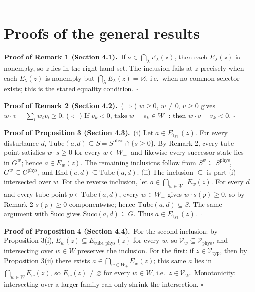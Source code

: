 \documentclass[review,11pt]{elsarticle}
\begin{document}
\begin{center}\rule{0.5\linewidth}{0.5pt}\end{center}


\appendix

\section{Proofs of the general results}

\textbf{Proof of Remark 1 (Section 4.1).}\ If \(a \in \bigcap_\lambda E_\lambda(z)\), then each
\(E_\lambda(z)\) is nonempty, so \(z\) lies in the right-hand set. The
inclusion fails at \(z\) precisely when each \(E_\lambda(z)\) is
nonempty but \(\bigcap_\lambda E_\lambda(z) = \varnothing\), i.e.~when
no common selector exists; this is the stated equality condition. \ensuremath{\square}

\textbf{Proof of Remark 2 (Section 4.2).}\ (\(\Rightarrow\)) \(w \ge 0\), \(w \neq 0\), \(v \ge 0\)
gives \(w \cdot v = \sum_i w_i v_i \ge 0\). (\(\Leftarrow\)) If
\(v_k < 0\), take \(w = e_k \in W_+\): then \(w \cdot v = v_k < 0\). \ensuremath{\square}

\textbf{Proof of Proposition 3 (Section 4.3).}\ (i) Let \(a \in E_{\mathrm{typ}}(z)\). For every
disturbance \(d\),
\(\mathrm{Tube}(a,d) \subseteq S = S^{\mathrm{phys}} \cap \{s \ge 0\}\).
By Remark 2, every tube point satisfies \(w \cdot s \ge 0\) for every
\(w \in W_+\), and likewise every successor state lies in \(G^w\); hence
\(a \in E_w(z)\). The remaining inclusions follow from
\(S^w \subseteq S^{\mathrm{phys}}\),
\(G^w \subseteq G^{\mathrm{phys}}\), and
\(\mathrm{End}(a,d) \subseteq \mathrm{Tube}(a,d)\). (ii) The inclusion
\(\subseteq\) is part (i) intersected over \(w\). For the reverse
inclusion, let \(a \in \bigcap_{w \in W_+} E_w(z)\). For every \(d\) and
every tube point \(p \in \mathrm{Tube}(a,d)\), every \(w \in W_+\) gives
\(w \cdot s(p) \ge 0\), so by Remark 2 \(s(p) \ge 0\) componentwise;
hence \(\mathrm{Tube}(a,d) \subseteq S\). The same argument with
\(\mathrm{Succ}\) gives \(\mathrm{Succ}(a,d) \subseteq G\). Thus
\(a \in E_{\mathrm{typ}}(z)\). \ensuremath{\square}

\textbf{Proof of Proposition 4 (Section 4.4).}\ For the second inclusion: by Proposition 3(i),
\(E_w(z) \subseteq E_{\mathrm{tube,phys}}(z)\) for every \(w\), so
\(\mathcal{V}_w \subseteq \mathcal{V}_{\mathrm{phys}}\), and
intersecting over \(w \in W\) preserves the inclusion. For the first: if
\(z \in \mathcal{V}_{\mathrm{typ}}\), then by Proposition 3(ii) there
exists \(a \in \bigcap_{w \in W_+} E_w(z)\); this same \(a\) lies in
\(\bigcap_{w \in W} E_w(z)\), so \(E_w(z) \neq \varnothing\) for every
\(w \in W\), i.e.~\(z \in \mathcal{V}_W\). Monotonicity: intersecting
over a larger family can only shrink the intersection. \ensuremath{\square}
\end{document}
